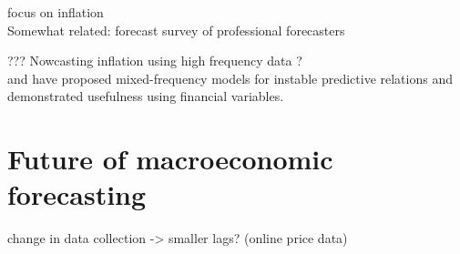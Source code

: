 \documentclass[12pt,a4paper]{scrartcl}
\begin{document}
\citet{MonteforteMoretti2013} focus on inflation\\

Somewhat related: forecast survey of professional forecasters

\citet{Modugno2013} ??? Nowcasting inflation using high frequency data ?\\

\citet{Galvao2013} and \citet{GuerinEtal2013} have proposed mixed-frequency models for instable predictive relations and demonstrated usefulness using financial variables.\\

\section{Future of macroeconomic forecasting}

change in data collection -> smaller lags? (online price data)



\end{document}
